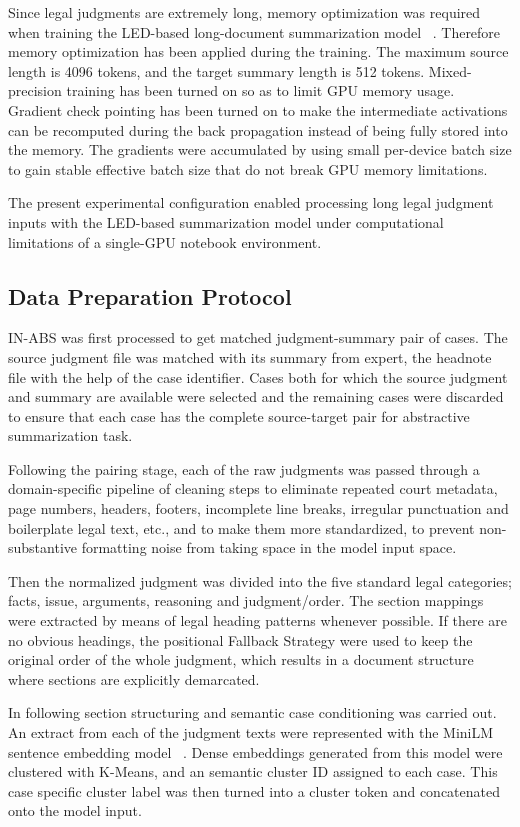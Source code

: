 \documentclass[11pt, a4paper]{article}
\theoremstyle{plain}%
\theoremstyle{remark}%
\theoremstyle{definition}%
\begin{document}
Since legal judgments are extremely long, memory optimization was required when training the LED-based long-document summarization model ~\cite{b21}. Therefore memory optimization has been applied during the training. The maximum source length is 4096 tokens, and the target summary length is 512 tokens. Mixed-precision training has been turned on so as to limit GPU memory usage. Gradient check pointing has been turned on to make the intermediate activations can be recomputed during the back propagation instead of being fully stored into the memory. The gradients were accumulated by using small per-device batch size to gain stable effective batch size that do not break GPU memory limitations.

The present experimental configuration enabled processing long legal judgment inputs with the LED-based summarization model under computational limitations of a single-GPU notebook environment.

\subsection{Data Preparation Protocol}

IN-ABS was first processed to get matched judgment-summary pair of cases. The source judgment file was matched with its summary from expert, the headnote file with the help of the case identifier. Cases both for which the source judgment and summary are available were selected and the remaining cases were discarded to ensure that each case has the complete source-target pair for abstractive summarization task.

Following the pairing stage, each of the raw judgments was passed through a domain-specific pipeline of cleaning steps to eliminate repeated court metadata, page numbers, headers, footers, incomplete line breaks, irregular punctuation and boilerplate legal text, etc., and to make them more standardized, to prevent non-substantive formatting noise from taking space in the model input space.

Then the normalized judgment was divided into the five standard legal categories; facts, issue, arguments, reasoning and judgment/order. The section mappings were extracted by means of legal heading patterns whenever possible. If there are no obvious headings, the positional Fallback Strategy were used to keep the original order of the whole judgment, which results in a document structure where sections are explicitly demarcated.

In following section structuring and semantic case conditioning was carried out. An extract from each of the judgment texts were represented with the MiniLM sentence embedding model ~\cite{b41}. Dense embeddings generated from this model were clustered with K-Means, and an semantic cluster ID assigned to each case. This case specific cluster label was then turned into a cluster token and concatenated onto the model input.
\end{document}
